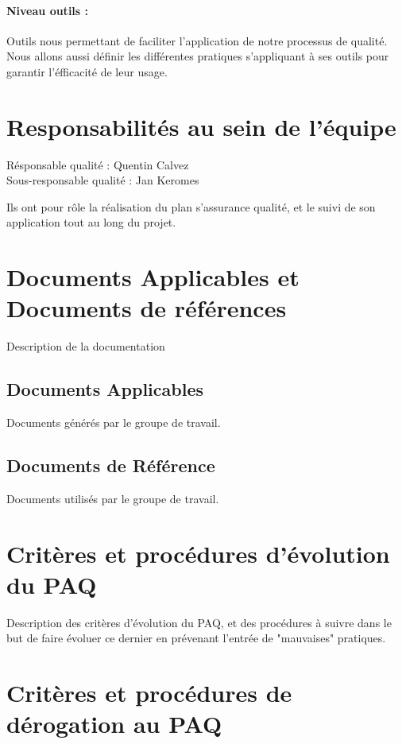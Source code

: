 \documentclass[a4paper, 18pt]{article}
\begin{document}
\paragraph{Niveau outils :} Outils nous permettant de faciliter l'application de notre processus de qualité. Nous allons aussi définir les différentes pratiques s'appliquant à ses outils pour garantir l'éfficacité de leur usage.

\section{Responsabilités au sein de l'équipe}

Résponsable qualité : Quentin Calvez \\
Sous-responsable qualité : Jan Keromes

Ils ont pour rôle la réalisation du plan s'assurance qualité, et le suivi de son application tout au long du projet.

\section{Documents Applicables et Documents de références }

Description de la documentation 

\subsection{Documents Applicables}

Documents générés par le groupe de travail.

\subsection{Documents de Référence}

Documents utilisés par le groupe de travail.

\section{Critères et procédures d'évolution du PAQ}

Description des critères d'évolution du PAQ, et des procédures à suivre dans le but de faire évoluer ce dernier en prévenant l'entrée de "mauvaises" pratiques.

\section{Critères et procédures de dérogation au PAQ}
\end{document}
